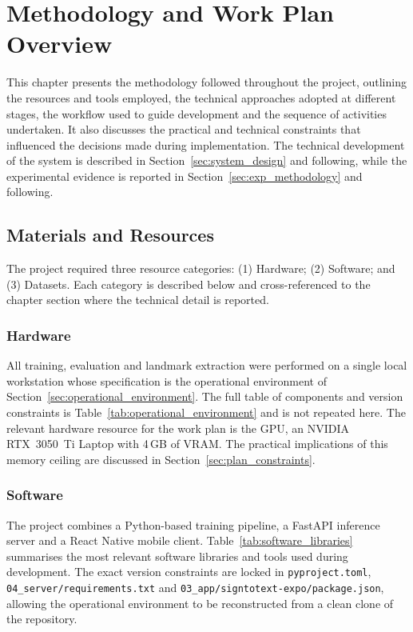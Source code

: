 \chapter{Methodology and Work Plan Overview}
\setcounter{section}{0}

This chapter presents the methodology followed throughout the project, outlining the resources and
tools employed, the technical approaches adopted at different stages, the workflow used to guide
development and the sequence of activities undertaken. It also discusses the practical and
technical constraints that influenced the decisions made during implementation. The technical
development of the system is described in Section~\ref{sec:system_design} and following, while the
experimental evidence is reported in Section~\ref{sec:exp_methodology} and following.

\section{Materials and Resources}
\label{sec:plan_materials}

The project required three resource categories: (1) Hardware; (2) Software; and (3) Datasets. Each
category is described below and cross-referenced to the chapter section where the technical detail
is reported.

\subsection{Hardware}

All training, evaluation and landmark extraction were performed on a single local workstation whose
specification is the operational environment of Section~\ref{sec:operational_environment}. The full
table of components and version constraints is Table~\ref{tab:operational_environment} and is not
repeated here. The relevant hardware resource for the work plan is the GPU, an NVIDIA RTX~3050~Ti
Laptop with 4\,GB of VRAM. The practical implications of this memory ceiling are discussed in
Section~\ref{sec:plan_constraints}.

\subsection{Software}

The project combines a Python-based training pipeline, a FastAPI inference server and a React
Native mobile client. Table~\ref{tab:software_libraries} summarises the most relevant software
libraries and tools used during development. The exact version constraints are locked in
\texttt{pyproject.toml}, \texttt{04\_server/requirements.txt} and
\texttt{03\_app/signtotext-expo/package.json}, allowing the operational environment to be
reconstructed from a clean clone of the repository.

